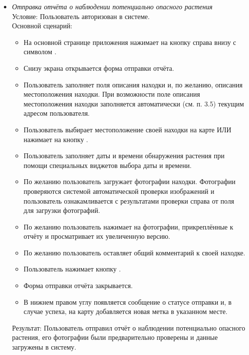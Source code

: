\begin{itemize}[topsep=0pt, parsep=0pt, itemsep=0pt, leftmargin=*, labelindent=0.5cm]
	\item \textit{Отправка отчёта о наблюдении потенциально опасного растения} \\
	Условие: Пользователь авторизован в системе. \\
	Основной сценарий:
	\begin{itemize}[topsep=0pt, parsep=0pt, itemsep=0pt, leftmargin=*, labelindent=0.5cm]
		\item На основной странице приложения нажимает на кнопку справа внизу с символом \textquote{+}.
		\item Снизу экрана открывается форма отправки отчёта.
		\item Пользователь заполняет поля описания находки и, по желанию, описания местоположения находки. При возможности поле описания местоположения находки заполняется автоматически (см. п. 3.5) текущим адресом пользователя.
		\item Пользователь выбирает местоположение своей находки на карте ИЛИ нажимает на кнопку .
		\item Пользователь заполняет даты и времени обнаружения растения при помощи специальных виджетов выбора даты и времени.
		\item По желанию пользователь загружает фотографии находки. Фотографии проверяются системой автоматической проверки изображений и пользователь ознакамливается с результатами проверки справа от поля для загрузки фотографий.
		\item По желанию пользователь нажимает на фотографии, прикреплённые к отчёту и просматривает их увеличенную версию.
		\item По желанию пользователь оставляет общий комментарий к своей находке.
		\item Пользователь нажимает кнопку .
		\item Форма отправки отчёта закрывается.
		\item В нижнем правом углу появляется сообщение о статусе отправки и, в случае успеха, на карту добавляется новая метка в указанном месте.
	\end{itemize}
	Результат: Пользователь отправил отчёт о наблюдении потенциально опасного растения, его фотографии были предварительно проверены и данные загружены в систему.
	

\end{itemize}
